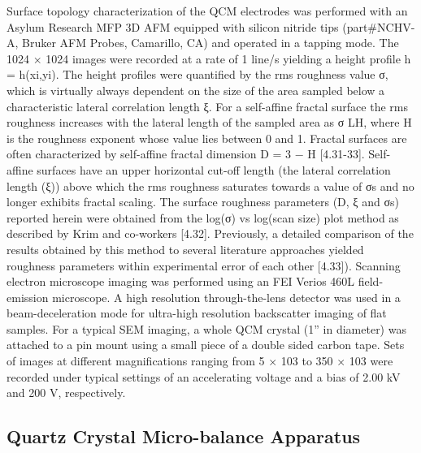 Surface topology characterization of the QCM electrodes was performed with an Asylum Research MFP 3D AFM equipped with silicon nitride tips (part\#NCHV-A, Bruker AFM Probes, Camarillo, CA) and operated in a tapping mode. The 1024 × 1024 images were recorded at a rate of 1 line/s yielding a height profile h = h(xi,yi). The height profiles were quantified by the rms roughness value σ, which is virtually always dependent on the size of the area sampled below a characteristic lateral correlation length ξ. For a self-affine fractal surface the rms roughness increases with the lateral length of the sampled area as σ   LH, where H is the roughness exponent whose value lies between 0 and 1. Fractal surfaces are often characterized by self-affine fractal dimension D = 3 − H [4.31-33]. Self-affine surfaces have an upper horizontal cut-off length (the lateral correlation length (ξ)) above which the rms roughness saturates towards a value of σs and no longer exhibits fractal scaling. The surface roughness parameters (D, ξ and σs) reported herein were obtained from the log(σ) vs log(scan size) plot method as described by Krim and co-workers [4.32]. Previously, a detailed comparison of the results obtained by this method to several literature approaches yielded roughness parameters within experimental error of each other [4.33]).
Scanning electron microscope imaging was performed using an FEI Verios 460L field-emission microscope. A high resolution through-the-lens detector was used in a beam-deceleration mode for ultra-high resolution backscatter imaging of flat samples. For a typical SEM imaging, a whole QCM crystal (1” in diameter) was attached to a pin mount using a small piece of a double sided carbon tape. Sets of images at different magnifications ranging from 5 × 103 to 350 × 103 were recorded under typical settings of an accelerating voltage and a bias of 2.00 kV and 200 V, respectively.

\subsection{Quartz Crystal Micro-balance Apparatus}

